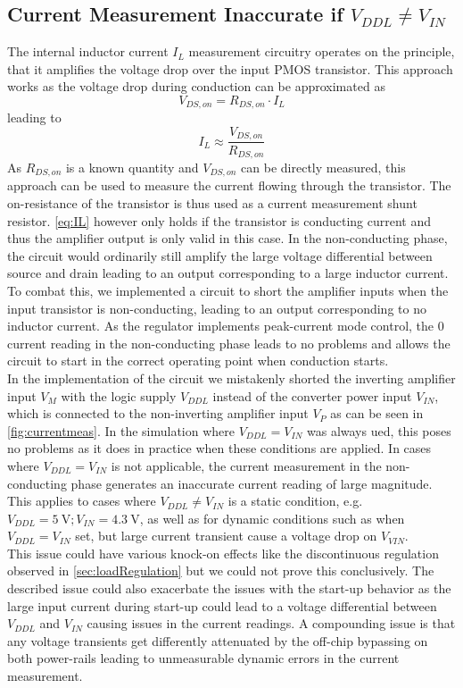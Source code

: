 \subsection{Current Measurement Inaccurate if $V_{DDL} \neq V_{IN}$}
\label{subsubsec:cur_mes_inac}
The internal inductor current $I_L$ measurement circuitry operates on the principle, that it amplifies the voltage drop over the input \ac{PMOS} transistor. This approach works as the voltage drop during conduction can be approximated as 
\begin{equation}
    V_{DS,on} = R_{DS,on} \cdot I_L
\end{equation}
\label{eq:Vds}
leading to 
\begin{equation}
    I_L \approx \frac{V_{DS,on}}{R_{DS,on}}
\end{equation}
\label{eq:IL}
As $R_{DS,on}$ is a known quantity and $V_{DS,on}$ can be directly measured, this approach can be used to measure the current flowing through the transistor.
The on-resistance of the transistor is thus used as a current measurement shunt resistor. \autoref{eq:IL} however only holds if the transistor is conducting current and thus the amplifier output is only valid in this case. In the non-conducting phase, the circuit would ordinarily still amplify the large voltage differential between source and drain leading to an output corresponding to a large inductor current. To combat this, we implemented a circuit to short the amplifier inputs when the input transistor is non-conducting, leading to an output corresponding to no inductor current. As the regulator implements peak-current mode control, the 0 current reading in the non-conducting phase leads to no problems and allows the circuit to start in the correct operating point when conduction starts. \\
In the implementation of the circuit we mistakenly shorted the inverting amplifier input $V_M$ with the logic supply $V_{DDL}$ instead of the converter power input $V_{IN}$, which is connected to the non-inverting amplifier input $V_P$ as can be seen in \autoref{fig:currentmeas}. In the simulation where $V_{DDL} = V_{IN}$ was always ued, this poses no problems as it does in practice when these conditions are applied. In cases where $V_{DDL} = V_{IN}$ is not applicable, the current measurement in the non-conducting phase generates an inaccurate current reading of large magnitude. This applies to cases where $V_{DDL} \neq V_{IN}$ is a static condition, e.g. $V_{DDL} = \qty{5}{\volt}; V_{IN}= \qty{4.3}{\volt}$, as well as for dynamic conditions such as when $V_{DDL} = V_{IN}$ set, but large current transient cause a voltage drop on $V_{VIN}$.\\
This issue could have various knock-on effects like the discontinuous regulation observed in \autoref{sec:loadRegulation} but we could not prove this conclusively. The described issue could also exacerbate the issues with the start-up behavior as the large input current during start-up could lead to a voltage differential between $V_{DDL}$ and $V_{IN}$ causing issues in the current readings. A compounding issue is that any voltage transients get differently attenuated by the off-chip bypassing on both power-rails leading to unmeasurable dynamic errors in the current measurement.

